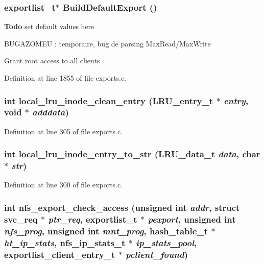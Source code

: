 \subsubsection{\setlength{\rightskip}{0pt plus 5cm}exportlist\_\-t$\ast$ Build\-Default\-Export ()}\label{exports_8c_a72}


\begin{Desc}
\item[{\bf Todo}]set default values here 

BUGAZOMEU : temporaire, bug de parsing Max\-Read/Max\-Write\end{Desc}


Grant root access to all clients 

Definition at line 1855 of file exports.c.
\subsubsection{\setlength{\rightskip}{0pt plus 5cm}int local\_\-lru\_\-inode\_\-clean\_\-entry (LRU\_\-entry\_\-t $\ast$ {\em entry}, void $\ast$ {\em adddata})}\label{exports_8c_a66}




Definition at line 305 of file exports.c.
\subsubsection{\setlength{\rightskip}{0pt plus 5cm}int local\_\-lru\_\-inode\_\-entry\_\-to\_\-str (LRU\_\-data\_\-t {\em data}, char $\ast$ {\em str})}\label{exports_8c_a65}




Definition at line 300 of file exports.c.
\subsubsection{\setlength{\rightskip}{0pt plus 5cm}int nfs\_\-export\_\-check\_\-access (unsigned int {\em addr}, struct svc\_\-req $\ast$ {\em ptr\_\-req}, exportlist\_\-t $\ast$ {\em pexport}, unsigned int {\em nfs\_\-prog}, unsigned int {\em mnt\_\-prog}, hash\_\-table\_\-t $\ast$ {\em ht\_\-ip\_\-stats}, nfs\_\-ip\_\-stats\_\-t $\ast$ {\em ip\_\-stats\_\-pool}, exportlist\_\-client\_\-entry\_\-t $\ast$ {\em pclient\_\-found})}\label{exports_8c_a74}


